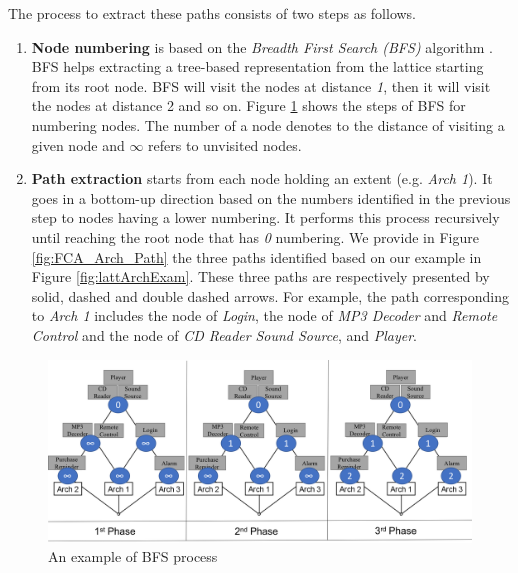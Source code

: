 \documentclass[graybox]{svmult}
\begin{document}
The process to extract these paths consists of two steps as follows. 

\begin{enumerate}
    \item \textbf{Node numbering} is based on the \textit{Breadth First Search (BFS)} algorithm \cite{cormen2009introduction}. BFS helps extracting a tree-based representation from the lattice starting from its root node. BFS will visit the nodes at distance \textit{1}, then it will visit the nodes at distance 2 and so on. Figure \ref{fig:BFSexample} shows the steps of BFS for numbering nodes. The number of a node denotes to the distance of visiting a given node and $\infty$ refers to unvisited nodes. 
    
    \item \textbf{Path extraction} starts from each node holding an extent (e.g. \textit{Arch 1}). It goes in a bottom-up direction based on the numbers identified in the previous step to nodes having a lower numbering. It performs this process recursively until reaching the root node that has \textit{0} numbering. We provide in Figure \ref{fig:FCA_Arch_Path} the three paths identified based on our example in Figure \ref{fig:lattArchExam}. These three paths are respectively presented by solid, dashed and double dashed arrows. For example, the path corresponding to \textit{Arch 1} includes the node of \textit{Login}, the node of \textit{MP3 Decoder} and \textit{Remote Control} and the node of \textit{CD Reader} \textit{Sound Source}, and \textit{Player}.
\end{enumerate}

\begin{figure} [h]
\centering
\includegraphics[width=\textwidth]{figs/bfsExample.png}
\caption{An example of BFS process}
\label{fig:BFSexample}
\end{figure}
\end{document}
